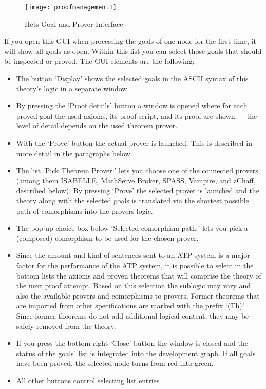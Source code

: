 \documentclass{article}
\newcommand{\normalTEXTSC}[2]{{#1\scriptsize#2}}
\newcommand     {\Isabelle}{\normalTEXTSC{I}{SABELLE}\xspace}
\newcommand     {\SPASS}{\normalTEXTSC{S}{PASS}\xspace}
\begin{document}
\begin{figure}
\centering
\texttt{[image: proofmanagement1]}
\caption{Hets Goal and Prover Interface\label{fig:proof_window}}
\end{figure}

If you open this GUI when processing the goals of one node for the
first time, it will show all goals as open. Within this list you can
select those goals that should be inspected or proved. The GUI elements are the following:

\begin{itemize}
\item The button `Display' shows the selected goals in the ASCII syntax of
  this theory's logic in a separate window.
\item By pressing the `Proof details' button a window is opened where for each
  proved goal the used axioms, its proof script, and its proof are shown ---
  the level of detail depends on the used theorem prover.
\item With the `Prove' button the actual prover is launched. This is described
  in more detail in the paragraphs below.
\item The list `Pick Theorem Prover:' lets you choose one of the connected
  provers (among them \Isabelle, MathServe Broker, \SPASS, Vampire, and
  zChaff, described below). By pressing `Prove' the selected prover is
  launched and the theory along with the selected goals is translated via the
  shortest possible path of comorphisms into the provers logic.
\item The pop-up choice box below `Selected comorphism path:' lets you pick a
  (composed) comorphism to be used for the chosen prover.
\item Since the amount and kind of sentences sent to an ATP system is a major
  factor for the performance of the ATP system, it is possible to select in
  the bottom lists the axioms and proven theorems that will comprise the
  theory of the next proof attempt. Based on this selection the sublogic may
  vary and also the available provers and comorphisms to provers. Former
  theorems that are imported from other specifications are marked with the
  prefix `(Th)'. Since former theorems do not add additional logical content,
  they may be safely removed from the theory.
\item If you press the bottom-right `Close' button the window is closed and
  the status of the goals' list is integrated into the development graph. If
  all goals have been proved, the selected node turns from red into green.
\item All other buttons control selecting list entries
\end{itemize}
\end{document}
